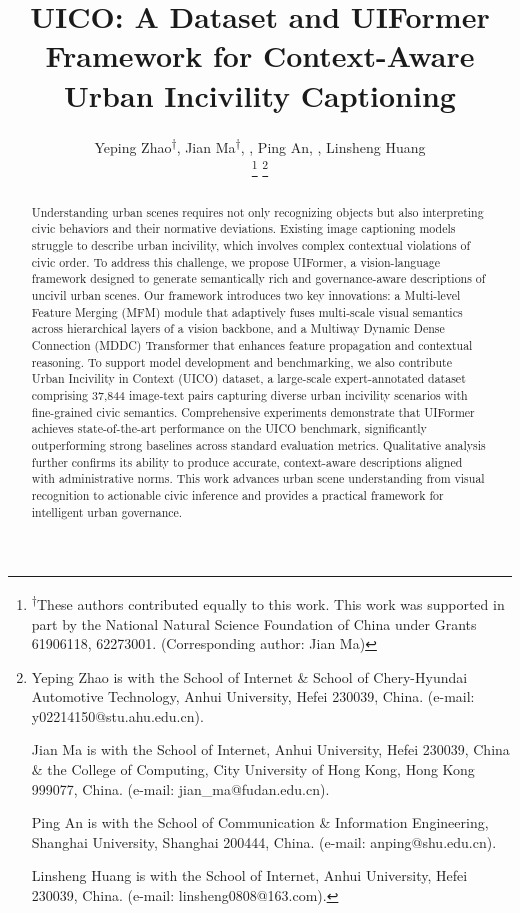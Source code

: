\documentclass[lettersize,journal]{IEEEtran}
\begin{document}
	
	\title{UICO: A Dataset and UIFormer Framework for Context-Aware Urban Incivility Captioning}
	
	\author{Yeping Zhao\textsuperscript{†},
		Jian Ma\textsuperscript{†}, ,
		Ping An, ,
		Linsheng Huang
		
		\thanks{\textsuperscript{†}These authors contributed equally to this work. This work was supported in part by the National Natural Science Foundation of China under Grants 61906118, 62273001. (Corresponding author: Jian Ma)}
		\thanks{Yeping Zhao is with the School of Internet \& School of Chery-Hyundai Automotive Technology, Anhui University, Hefei 230039, China. (e-mail: y02214150@stu.ahu.edu.cn).
			
			Jian Ma is with the School of Internet, Anhui University, Hefei 230039, China \& the College of Computing, City University of Hong Kong, Hong Kong 999077, China. (e-mail: jian\_ma@fudan.edu.cn).
			
			Ping An is with the School of Communication \& Information Engineering, Shanghai University, Shanghai 200444, China. (e-mail: anping@shu.edu.cn).
			
			
			Linsheng Huang is with the School of Internet, Anhui University, Hefei 230039, China. (e-mail: linsheng0808@163.com).
		}
	}
	
	\maketitle
	\noindent
	
	\begin{abstract}
		Understanding urban scenes requires not only recognizing objects but also interpreting civic behaviors and their normative deviations. Existing image captioning models struggle to describe urban incivility, which involves complex contextual violations of civic order. To address this challenge, we propose UIFormer, a vision-language framework designed to generate semantically rich and governance-aware descriptions of uncivil urban scenes. Our framework introduces two key innovations: a Multi-level Feature Merging (MFM) module that adaptively fuses multi-scale visual semantics across hierarchical layers of a vision backbone, and a Multiway Dynamic Dense Connection (MDDC) Transformer that enhances feature propagation and contextual reasoning. To support model development and benchmarking, we also contribute Urban Incivility in Context (UICO) dataset, a large-scale expert-annotated dataset comprising 37,844 image-text pairs capturing diverse urban incivility scenarios with fine-grained civic semantics. Comprehensive experiments demonstrate that UIFormer achieves state-of-the-art performance on the UICO benchmark, significantly outperforming strong baselines across standard evaluation metrics. Qualitative analysis further confirms its ability to produce accurate, context-aware descriptions aligned with administrative norms. This work advances urban scene understanding from visual recognition to actionable civic inference and provides a practical framework for intelligent urban governance.
	\end{abstract}
	
\end{document}
